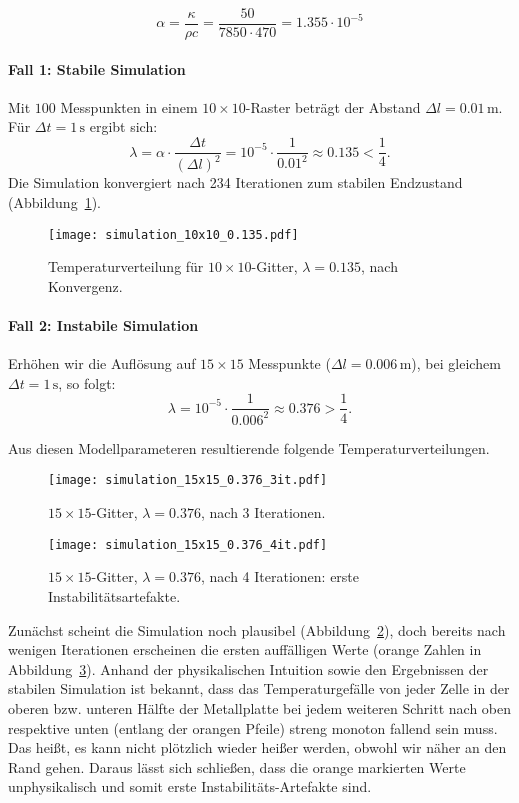 \[
\alpha =
\frac{\kappa}{\rho c}
=
\frac{50}{7850 \cdot 470}
= 1.355 \cdot 10^{-5}
\]

\paragraph{Fall 1: Stabile Simulation}  
Mit \(100\) Messpunkten in einem \(10\times 10\)-Raster beträgt der Abstand \(\Delta l = 0.01\,\mathrm{m}\).  
Für \(\Delta t = 1\,\mathrm{s}\) ergibt sich:
\[
\lambda =
\alpha \cdot \frac{\Delta t}{(\Delta l)^2}
=
10^{-5} \cdot \frac{1}{0.01^2}
\approx 0.135 < \frac14.
\]
Die Simulation konvergiert nach 234 Iterationen zum stabilen Endzustand (Abbildung~\ref{parallelisierung:fig:simulation_10x10_0.135}).

\begin{figure}[htbp]
	\centering
	\texttt{[image: simulation\_10x10\_0.135.pdf]}
	\caption{Temperaturverteilung für \(10\times 10\)-Gitter, \(\lambda = 0.135\), nach Konvergenz.}
	\label{parallelisierung:fig:simulation_10x10_0.135}
\end{figure}

\paragraph{Fall 2: Instabile Simulation}  
Erhöhen wir die Auflösung auf \(15\times 15\) Messpunkte (\(\Delta l = 0.006\,\mathrm{m}\)), bei gleichem \(\Delta t = 1\,\mathrm{s}\), so folgt:
\[
\lambda =
10^{-5} \cdot \frac{1}{0.006^2}
\approx 0.376 > \frac14.
\]

Aus diesen Modellparameteren resultierende folgende Temperaturverteilungen.

\begin{figure}[htbp]
	\centering
	\texttt{[image: simulation\_15x15\_0.376\_3it.pdf]}
	\caption{\(15\times 15\)-Gitter, \(\lambda = 0.376\), nach 3 Iterationen.}
	\label{parallelisierung:fig:simulation_15x15_0.376_3it}
\end{figure}

\begin{figure}[htbp]
	\centering
	\texttt{[image: simulation\_15x15\_0.376\_4it.pdf]}
	\caption{\(15\times 15\)-Gitter, \(\lambda = 0.376\), nach 4 Iterationen: erste Instabilitätsartefakte.}
	\label{parallelisierung:fig:simulation_15x15_0.376_4it}
\end{figure}

Zunächst scheint die Simulation noch plausibel (Abbildung~\ref{parallelisierung:fig:simulation_15x15_0.376_3it}), doch bereits nach wenigen Iterationen erscheinen die ersten auffälligen Werte (orange Zahlen in Abbildung~\ref{parallelisierung:fig:simulation_15x15_0.376_4it}). Anhand der physikalischen Intuition sowie den Ergebnissen der stabilen Simulation ist bekannt, dass das Temperaturgefälle von jeder Zelle in der oberen bzw. unteren Hälfte der Metallplatte bei jedem weiteren Schritt nach oben respektive unten (entlang der orangen Pfeile) streng monoton fallend sein muss. Das heißt, es kann nicht plötzlich wieder heißer werden, obwohl wir näher an den Rand gehen. Daraus lässt sich schließen, dass die orange markierten Werte unphysikalisch und somit erste Instabilitäts-Artefakte sind.


